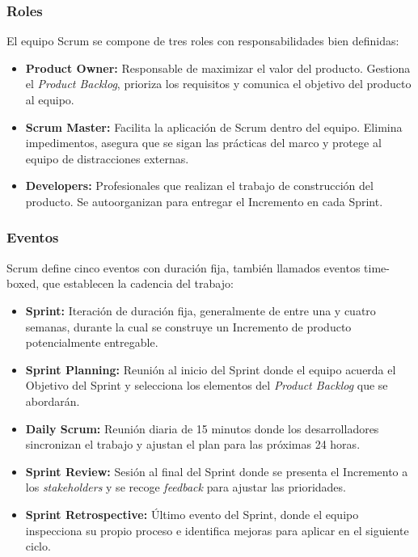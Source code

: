 \subsubsection{Roles}

El equipo Scrum se compone de tres roles con responsabilidades bien definidas:

\begin{itemize}
    \item \textbf{Product Owner:} Responsable de maximizar el valor del producto. Gestiona el \textit{Product Backlog}, prioriza los requisitos y comunica el objetivo del producto al equipo.
    \item \textbf{Scrum Master:} Facilita la aplicación de Scrum dentro del equipo. Elimina impedimentos, asegura que se sigan las prácticas del marco y protege al equipo de distracciones externas.
    \item \textbf{Developers:} Profesionales que realizan el trabajo de construcción del producto. Se autoorganizan para entregar el Incremento en cada Sprint.
\end{itemize}

\subsubsection{Eventos}

Scrum define cinco eventos con duración fija, también llamados eventos time-boxed, que establecen la cadencia del trabajo:

\begin{itemize}
    \item \textbf{Sprint:} Iteración de duración fija, generalmente de entre una y cuatro semanas, durante la cual se construye un Incremento de producto potencialmente entregable.
    \item \textbf{Sprint Planning:} Reunión al inicio del Sprint donde el equipo acuerda el Objetivo del Sprint y selecciona los elementos del \textit{Product Backlog} que se abordarán.
    \item \textbf{Daily Scrum:} Reunión diaria de 15 minutos donde los desarrolladores sincronizan el trabajo y ajustan el plan para las próximas 24 horas.
    \item \textbf{Sprint Review:} Sesión al final del Sprint donde se presenta el Incremento a los \textit{stakeholders} y se recoge \textit{feedback} para ajustar las prioridades.
    \item \textbf{Sprint Retrospective:} Último evento del Sprint, donde el equipo inspecciona su propio proceso e identifica mejoras para aplicar en el siguiente ciclo.
\end{itemize}


